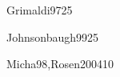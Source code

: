 \begin{sumilla}
\begin{unit}{\DSCUATRODef}{Grimaldi97}{25}
   \begin{topicos}
	 \item 	\DSCUATROTopicArgumentos
	 \item 	\DSCUATROTopicPermutaciones
	 \item 	\DSCUATROTopicPrincipio
	 \item 	\DSCUATROTopicSolucion 
   \end{topicos}

   \begin{objetivos}
	\item \DSCUATROObjUNO
	\item \DSCUATROObjDOS
	\item \DSCUATROObjTRES 
	\item \DSUNOObjCUATRO 
   \end{objetivos}
\end{unit}

\begin{unit}{\DSCINCODef}{Johnsonbaugh99}{25}
   \begin{topicos}
	 \item \DSCINCOTopicArboles
	 \item \DSCINCOTopicGrafos 
	 \item \DSCINCOTopicGrafosdirigidos
	 \item \DSCINCOTopicArbolesde 
	 \item \DSCINCOTopicEstrategias 
   \end{topicos}

   \begin{objetivos}
	 \item \DSCINCOObjUNO
	 \item \DSCINCOObjDOS
	 \item \DSCINCOObjTRES
	 \item \DSCINCOObjCUATRO
   \end{objetivos}
\end{unit}

\begin{unit}{\DSSEISDef}{Micha98,Rosen2004}{10}
   \begin{topicos}
      \item \DSSEISTopicEspacios
      \item \DSSEISTopicProbabilidad 
      \item \DSSEISTopicVariables 
   \end{topicos}

   \begin{objetivos}
      \item \DSSEISObjUNO
      \item \DSSEISObjDOS
      \item \DSSEISObjTRES
      \item \DSSEISObjCUATRO
   \end{objetivos}
\end{unit}


\end{sumilla}
